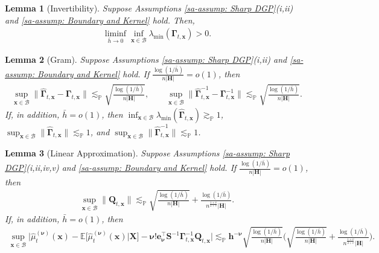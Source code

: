\documentclass[10pt]{article}
\newtheorem{lem}{Lemma}
\renewcommand{\P}{\mathbb{P}}
\newcommand{\E}{\mathbb{E}}
\newcommand{\lessp}{\lesssim_{\mathbb{P}}}
\newcommand{\be}{\mathbf{e}}
\newcommand{\bh}{\mathbf{h}}
\newcommand{\bH}{\mathbf{H}}
\newcommand{\bQ}{\mathbf{Q}}
\newcommand{\bS}{\mathbf{S}}
\newcommand{\bx}{\mathbf{x}}
\newcommand{\bX}{\mathbf{X}}
\newcommand{\bnu}{\boldsymbol{\nu}}
\newcommand{\bGamma}{\boldsymbol{\Gamma}}
\newcommand{\hGamma}{\widehat{\boldsymbol{\Gamma}}_{t, \bx}}
\newcommand{\Gammax}{\boldsymbol{\Gamma}_{t, \bx}}
\newcommand{\B}{\mathcal{B}}
\begin{document}
\begin{lem}[Invertibility]\label{sa-lem: Invertibility}
    Suppose Assumptions \ref{sa-assump: Sharp DGP}(i,ii) and \ref{sa-assump: Boundary and Kernel} hold. Then,
    \begin{align*}
        \liminf_{\bar{h} \to 0} \inf_{\bx \in \B}\lambda_{\min}(\bGamma_{t,\bx}) > 0.
    \end{align*}
\end{lem}

\begin{lem}[Gram]\label{sa-lem: Gram Matrix}
    Suppose Assumptions \ref{sa-assump: Sharp DGP}(i,ii) and \ref{sa-assump: Boundary and Kernel} hold. If $\frac{\log(1/\bar{h})}{n |\bH|} = o(1)$, then
    \begin{align*}
        \sup_{\bx \in \B} \big\|\hGamma - \Gammax\big\|  \lessp \sqrt{\frac{\log(1/\bar{h})}{n |\bH|}},
        \qquad
        \sup_{\bx \in \B} \big\|\hGamma^{-1} - \Gammax^{-1}\big\| \lessp \sqrt{\frac{\log(1/\bar{h})}{n |\bH|}}.
    \end{align*}
    If, in addition, $\bar{h} = o(1)$, then $\inf_{\bx \in \B}\lambda_{\min}(\hGamma) \gtrsim_{\P} 1$, $\sup_{\bx \in \B}\|\hGamma\|\lessp 1$, and $\sup_{\bx \in \B}\|\hGamma^{-1}\|\lessp 1$.
\end{lem}

\begin{lem}[Linear Approximation]\label{sa-lem: Linear Approximation}
    Suppose Assumptions \ref{sa-assump: Sharp DGP}(i,ii,iv,v) and \ref{sa-assump: Boundary and Kernel} hold. If $\frac{\log(1/\bar{h})}{n |\bH|} = o(1)$, then
    \begin{align*}
        \sup_{\bx \in \B} \big\|\bQ_{t,\bx} \big\| \lessp \sqrt{\frac{\log(1/\bar{h})}{n |\bH|}} + \frac{\log(1/\bar{h})}{n^{\frac{1+v}{2+v}}|\bH|}.
    \end{align*}
    If, in addition,  $\bar{h} = o(1)$, then
    \begin{align*}
        \sup_{\bx \in \B} \big|\widehat{\mu}_t^{(\bnu)}(\bx)   - \E\big[\widehat{\mu}_t^{(\bnu)}(\bx)\big|\bX\big] - \bnu!\be_{\bnu}^{\top}\bS^{-1}\bGamma_{t,\bx}^{-1}\bQ_{t,\bx}\big| \lessp \bh^{-\bnu} \sqrt{\frac{\log(1/\bar{h})}{n |\bH|}} \bigg(\sqrt{\frac{\log(1/\bar{h})}{n |\bH|}} + \frac{\log(1/\bar{h})}{n^{\frac{1+v}{2+v}}|\bH|} \bigg).
    \end{align*}
\end{lem}
\end{document}
